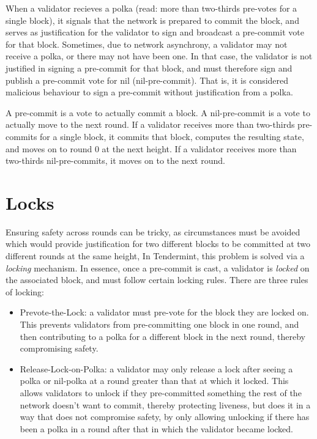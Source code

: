When a validator recieves a polka (read: more than two-thirds pre-votes for a single block), 
it signals that the network is prepared to commit the block,
and serves as justification for the validator to sign and broadcast a pre-commit vote for that block.
Sometimes, due to network asynchrony, a validator may not receive a polka, or there may not have been one. 
In that case, the validator is not justified in signing a pre-commit for that block, 
and must therefore sign and publish a pre-commit vote for nil (nil-pre-commit).
That is, it is considered malicious behaviour to sign a pre-commit without justification from a polka.

A pre-commit is a vote to actually commit a block.
A nil-pre-commit is a vote to actually move to the next round.
If a validator receives more than two-thirds pre-commits for a single block, 
it commits that block, computes the resulting state,
and moves on to round 0 at the next height.
If a validator receives more than two-thirds nil-pre-commits,
it moves on to the next round.

\section{Locks}

Ensuring safety across rounds can be tricky, 
as circumstances must be avoided which would provide justification for two different blocks to be committed at two different rounds at the same height, 
In Tendermint, this problem is solved via a \emph{locking} mechanism.
In essence, once a pre-commit is cast, a validator is \emph{locked} on the associated block, and must follow certain locking rules.
There are three rules of locking:

\begin{itemize}
\item{Prevote-the-Lock: a validator must pre-vote for the block they are locked on. 
	This prevents validators from pre-committing one block in one round, 
	and then contributing to a polka for a different block in the next round, 
	thereby compromising safety.}
\item{Release-Lock-on-Polka: a validator may only release a lock after seeing a polka or nil-polka at a round greater than that at which it locked.
	This allows validators to unlock if they pre-committed something the rest of the network doesn't want to commit,
	thereby protecting liveness, but does it in a way that does not compromise safety,
	by only allowing unlocking if there has been a polka in a round after that in which the validator became locked.}
\end{itemize}


